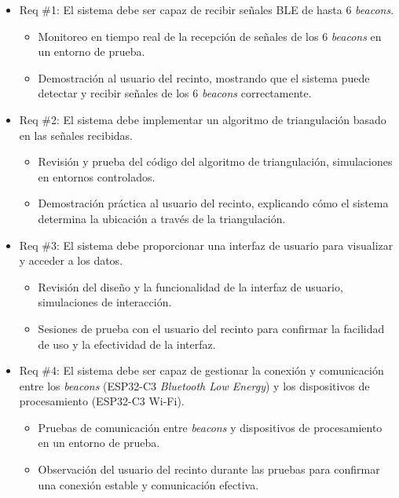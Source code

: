 \documentclass[
11pt, %
]{charter}
\begin{document}
\begin{itemize} 
\item Req \#1: El sistema debe ser capaz de recibir señales BLE de hasta 6 \textit{beacons}.

\begin{itemize}
	\item Monitoreo en tiempo real de la recepción de señales de los 6 \textit{beacons} en un entorno de prueba.
	\item Demostración al usuario del recinto, mostrando que el sistema puede detectar y recibir señales de los 6 \textit{beacons} correctamente.  
\end{itemize}

\item Req \#2: El sistema debe implementar un algoritmo de triangulación basado en las señales recibidas.

\begin{itemize}
	\item Revisión y prueba del código del algoritmo de triangulación, simulaciones en entornos controlados.
	\item Demostración práctica al usuario del recinto, explicando cómo el sistema determina la ubicación a través de la triangulación. 
\end{itemize}

\item Req \#3: El sistema debe proporcionar una interfaz de usuario para visualizar y acceder a los datos.

\begin{itemize}
	\item Revisión del diseño y la funcionalidad de la interfaz de usuario, simulaciones de interacción.
	\item Sesiones de prueba con el usuario del recinto para confirmar la facilidad de uso y la efectividad de la interfaz.
\end{itemize}

\item Req \#4: El sistema debe ser capaz de gestionar la conexión y comunicación entre los \textit{beacons} (ESP32-C3 \textit{Bluetooth Low Energy}) y los dispositivos de procesamiento (ESP32-C3 Wi-Fi).

\begin{itemize}
	\item Pruebas de comunicación entre \textit{beacons} y dispositivos de procesamiento en un entorno de prueba.
	\item Observación del usuario del recinto durante las pruebas para confirmar una conexión estable y comunicación efectiva.
\end{itemize}


\end{itemize}
\end{document}
